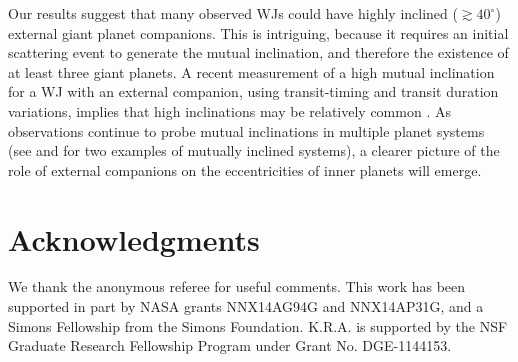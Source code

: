 \documentclass[12pt,useAMS, usenatbib]{mn2e}
\begin{document}
Our results suggest that many observed WJs could have highly inclined ($\gtrsim 40^\circ$) external giant planet companions. This is intriguing, because it requires an initial scattering event to generate the mutual inclination, and therefore the existence of at least three giant planets.  A recent measurement of a high mutual inclination for a WJ with an external companion, using transit-timing and transit duration variations, implies that high inclinations may be relatively common \citep{masuda2017}.  As observations continue to probe mutual inclinations in multiple planet systems (see \citealt{mcarthur2010} and \cite{mills2017} for two examples of mutually inclined systems), a clearer picture of the role of external companions on the eccentricities of inner planets will emerge.  

\section*{Acknowledgments}
We thank the anonymous referee for useful comments.  This work has been supported in part by NASA grants NNX14AG94G and NNX14AP31G, and a Simons Fellowship from the Simons Foundation.  K.R.A. is
supported by the NSF Graduate Research Fellowship Program under Grant
No. DGE-1144153.  







\clearpage
\end{document}
